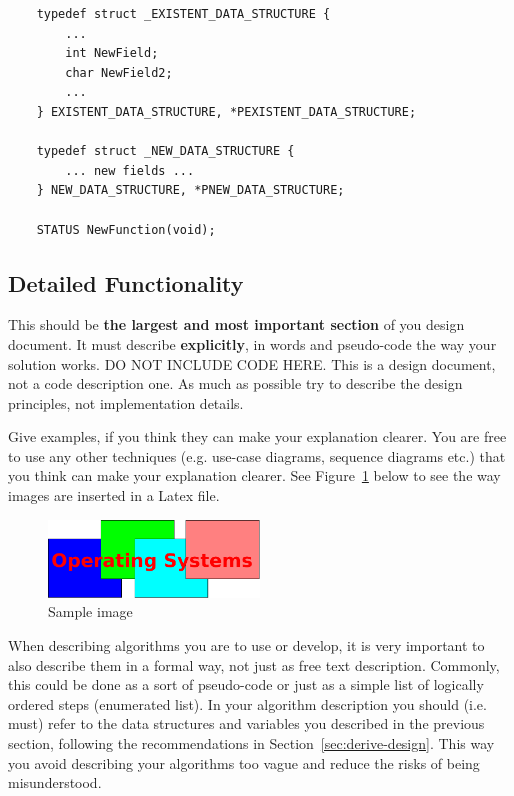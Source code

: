 \begin{lstlisting}
    typedef struct _EXISTENT_DATA_STRUCTURE {
        ...
        int NewField;
        char NewField2;
        ...
    } EXISTENT_DATA_STRUCTURE, *PEXISTENT_DATA_STRUCTURE;
    
    typedef struct _NEW_DATA_STRUCTURE {
        ... new fields ...
    } NEW_DATA_STRUCTURE, *PNEW_DATA_STRUCTURE;
    
    STATUS NewFunction(void);
\end{lstlisting}


\subsection{Detailed Functionality}

This should be \textbf{the largest and most important section} of you design document. It must describe \textbf{explicitly}, in words and pseudo-code the way your solution works. DO NOT INCLUDE CODE HERE. This is a design document, not a code description one. As much as possible try to describe the design principles, not implementation details. 

Give examples, if you think they can make your explanation clearer. You are free to use any other techniques (e.g. use-case diagrams, sequence diagrams etc.) that you think can make your explanation clearer. See Figure~\ref{fig:sample-image} below to see the way images are inserted in a Latex file. 

\begin{figure}[h]
	\centering
	\includegraphics[width=0.5\textwidth]{figures/sample-image.pdf}
	\caption{Sample image}
	\label{fig:sample-image}
\end{figure}

When describing algorithms you are to use or develop, it is very important to also describe them in a formal way, not just as free text description. Commonly, this could be done as a sort of pseudo-code or just as a simple list of logically ordered steps (enumerated list). In your algorithm description you should (i.e. must) refer to the data structures and variables you described in the previous section, following the recommendations in Section~\ref{sec:derive-design}. This way you avoid describing your algorithms too vague and reduce the risks of being misunderstood.  

